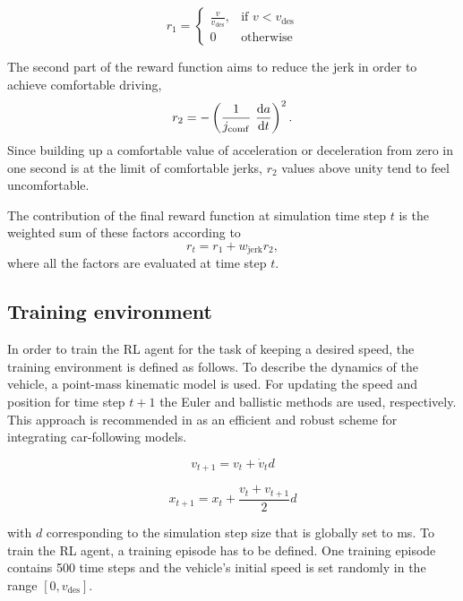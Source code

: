 \documentclass[review]{elsarticle}
\providecommand{\martin}[1]{#1}                  %
\providecommand{\martinc}[1]{}                  %
\providecommand{\sub}[1]{_{\mathrm{#1}}}  %
\providecommand{\3}{{\ss}}
\begin{document}
\begin{equation}
\label{eq:r1Free}
	r_1  = 
	\begin{cases}
	\frac{v}{v\sub{des}},
	& \text{if } v < v\sub{des}\\
	0
	 & \text{otherwise}
	\end{cases}
\end{equation}

The second part of the reward function aims to reduce the jerk in
order to achieve comfortable driving, \martinc{No need for dotted
  quantities here; I propose using $j\sub{comf}$} \martinc{Really
  $\dv{a}{t}$ or the second state variable defined in~\eqref{eq:stateFree}?}
\begin{equation}
\label{eq:r2Free}
r_2 = -\left(\frac{1}{j\sub{comf}} \ \dv{a}{t}\right)^2.
\end{equation}
%
Since building up a comfortable value of acceleration or deceleration
from zero in one second is at the limit of comfortable jerks, $r_2$
values above unity tend to feel uncomfortable.


The contribution of the final reward function at simulation time step $t$ is the weighted
sum of these factors according to
\begin{equation}
\label{rt1}
r_t =r_1 + w\sub{jerk} r_2,
\end{equation}
where all the factors are evaluated at time step $t$. 


\subsection{Training environment}
\label{training_environment1}
In order to train the RL agent for the task of keeping a desired
speed, the training environment is defined as follows. To describe the
dynamics of the vehicle, a point-mass kinematic model is used. For
updating the speed and position for time step $t + 1$ the Euler and
ballistic methods are used, respectively. This approach is recommended in \cite{numericalUpdateMethodsTreiber} as an efficient
and robust scheme for integrating car-following models.

\begin{equation}
	v_{t+1} = v_{t} + \martin{\dot{v}_{t}} d
\end{equation}

\begin{equation}
x_{t+1} = x_{t} + \frac{v_{t} + v_{t+1}}{2} d
\end{equation}


with $d$ corresponding to the simulation step size \martin{that} is globally
set to \unit[100]{ms}. To train the RL agent, a training episode has to be defined. One training episode contains 500 time steps and the vehicle's initial speed is set randomly in the range $[0,v\sub{des}]$.
\end{document}
